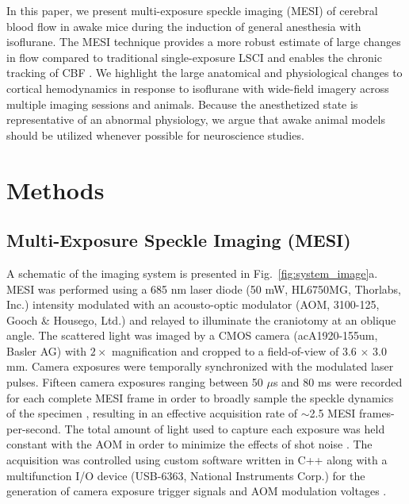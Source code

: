 \documentclass[12pt]{spieman}
\begin{document}
\begin{spacing}{2}
In this paper, we present multi-exposure speckle imaging (MESI) of cerebral blood flow in awake mice during the induction of general anesthesia with isoflurane. The MESI technique \cite{Parthasarathy:2008el} provides a more robust estimate of large changes in flow compared to traditional single-exposure LSCI \cite{Parthasarathy:2010vo} and enables the chronic tracking of CBF \cite{Kazmi:2013hp}. We highlight the large anatomical and physiological changes to cortical hemodynamics in response to isoflurane with wide-field imagery across multiple imaging sessions and animals. Because the anesthetized state is representative of an abnormal physiology, we argue that awake animal models should be utilized whenever possible for neuroscience studies.


\section{Methods}
\label{sect:methods}

\subsection{Multi-Exposure Speckle Imaging (MESI)}
A schematic of the imaging system is presented in Fig.~\ref{fig:system_image}a. MESI was performed using a 685 nm laser diode (50 mW, HL6750MG, Thorlabs, Inc.) intensity modulated with an acousto-optic modulator (AOM, 3100-125, Gooch \& Housego, Ltd.) and relayed to illuminate the craniotomy at an oblique angle. The scattered light was imaged by a CMOS camera (acA1920-155um, Basler AG) with $2\times$ magnification and cropped to a field-of-view of 3.6 $\times$ 3.0 mm. Camera exposures were temporally synchronized with the modulated laser pulses. Fifteen camera exposures ranging between 50 $\mu$s and 80 ms \cite{Parthasarathy:2008el,Atchia:2013ep,Kazmi:2013hp} were recorded for each complete MESI frame in order to broadly sample the speckle dynamics of the specimen \cite{Kazmi:2014go}, resulting in an effective acquisition rate of $\sim$2.5 MESI frames-per-second. The total amount of light used to capture each exposure was held constant with the AOM in order to minimize the effects of shot noise \cite{Parthasarathy:2008el}. The acquisition was controlled using custom software written in C++ along with a multifunction I/O device (USB-6363, National Instruments Corp.) for the generation of camera exposure trigger signals and AOM modulation voltages \cite{Sullender:2018ff}.


\end{spacing}
\end{document}
